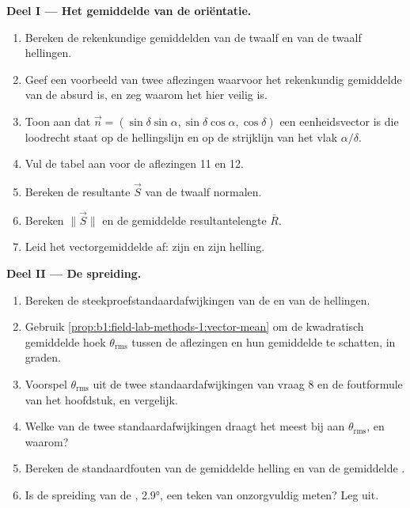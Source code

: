 \begin{problem}
\medskip
\noindent\textbf{Deel I --- Het gemiddelde van de oriëntatie.}
\begin{enumerate}
  \item Bereken de rekenkundige gemiddelden van de twaalf  en van de twaalf hellingen.
  \item Geef een voorbeeld van twee aflezingen waarvoor het rekenkundig gemiddelde van de 
        absurd is, en zeg waarom het hier veilig is.
  \item Toon aan dat $\vec n = (\sin\delta\sin\alpha, \sin\delta\cos\alpha,
        \cos\delta)$ een eenheidsvector is die loodrecht staat op de hellingslijn en op
        de strijklijn van het vlak $\alpha/\delta$.
  \item Vul de tabel aan voor de aflezingen 11 en 12.
  \item Bereken de resultante $\vec S$ van de twaalf normalen.
  \item Bereken $\|\vec S\|$ en de gemiddelde resultantelengte $\bar R$.
  \item Leid het vectorgemiddelde af: zijn  en zijn helling.
\end{enumerate}

\medskip
\noindent\textbf{Deel II --- De spreiding.}
\begin{enumerate}[resume]
  \item Bereken de steekproefstandaardafwijkingen van de  en van de hellingen.
  \item Gebruik \cref{prop:b1:field-lab-methods-1:vector-mean} om de kwadratisch gemiddelde hoek
        $\theta_{\text{rms}}$ tussen de aflezingen en hun gemiddelde te schatten, in graden.
  \item Voorspel $\theta_{\text{rms}}$ uit de twee standaardafwijkingen van vraag 8 en de foutformule van het
        hoofdstuk, en vergelijk.
  \item Welke van de twee standaardafwijkingen draagt het meest bij aan $\theta_{\text{rms}}$, en waarom?
  \item Bereken de standaardfouten van de gemiddelde helling en van de gemiddelde .
  \item Is de spreiding van de , \ang{2.9}, een teken van onzorgvuldig meten? Leg uit.
\end{enumerate}


\end{problem}
